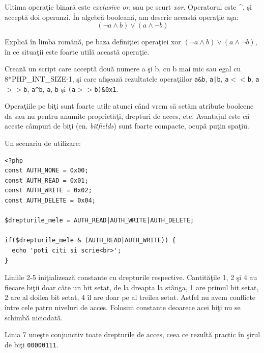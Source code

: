 Ultima operaţie binară este \textsl{exclusive or}, sau pe scurt
\textsl{xor}. Operatorul este \textasciicircum, şi
acceptă doi operanzi. În algebră booleană, am descrie această operaţie aşa:
\[(\lnot a \land b) \lor (a \land \lnot b)\]

\begin{Exercise}[title={Jonglează cu expresii boolene},difficulty=3]
Explică în limba română, pe baza definiţiei operaţiei xor
$(\lnot a \land b) \lor (a \land \lnot b)$,
în ce situaţii este foarte utilă această operaţie.
\end{Exercise}


\begin{Exercise}[title={Operaţii pe biţi}]
Crează un script care acceptă două numere a şi b, cu b mai mic sau egal cu 8*PHP\_INT\_SIZE-1, şi
care afişează rezultatele operaţiilor \texttt{a\&b}, \texttt{a|b}, \texttt{a$<<$b},
\texttt{a$>>$b}, \texttt{a{\textasciicircum}b},
\texttt{{\texttildelow}a}, \texttt{{\texttildelow}b} şi \texttt{(a$>>$b)\&0x1}.
\end{Exercise}

Operaţiile pe biţi sunt foarte utile atunci când vrem să setăm atribute booleene {\glqq}da sau nu{\grqq}
pentru anumite proprietăţi, drepturi de acces, etc. Avantajul este că aceste câmpuri de biţi
(en. \textsl{bitfields}) sunt foarte compacte, ocupă puţin spaţiu.

Un scenariu de utilizare:
\begin{lstlisting}
<?php
const AUTH_NONE = 0x00;
const AUTH_READ = 0x01;
const AUTH_WRITE = 0x02;
const AUTH_DELETE = 0x04;

$drepturile_mele = AUTH_READ|AUTH_WRITE|AUTH_DELETE;

if($drepturile_mele & (AUTH_READ|AUTH_WRITE)) {
  echo 'poti citi si scrie<br>';
}
\end{lstlisting}
Liniile 2-5 iniţializează constante cu drepturile respective.  Cantităţile 1, 2 şi 4
au fiecare biţii doar câte un bit setat, de la dreapta la stânga, 1 are primul bit setat,
2 are al doilea bit setat, 4 îl are doar pe al treilea setat. Astfel nu avem conflicte
între cele patru niveluri de acces. Folosim constante
deoarece acei biţi nu se schimbă niciodată.

Linia 7 uneşte conjunctiv toate drepturile de acces, ceea ce rezultă practic în şirul
de biţi \texttt{00000111}.

